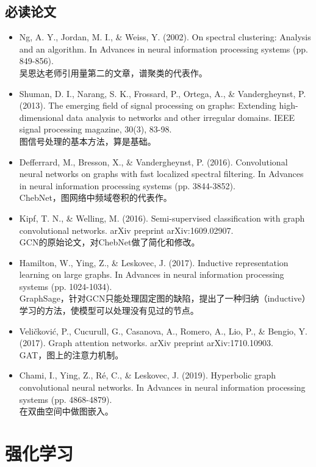 \documentclass[lang=cn,11pt,a4paper]{eleganttemplate}
\begin{document}
\subsection{必读论文}
\begin{itemize}
    \item Ng, A. Y., Jordan, M. I., \& Weiss, Y. (2002). On spectral clustering: Analysis and an algorithm. In Advances in neural information processing systems (pp. 849-856). \\
 	吴恩达老师引用量第二的文章，谱聚类的代表作。 
 	\item Shuman, D. I., Narang, S. K., Frossard, P., Ortega, A., \& Vandergheynst, P. (2013). The emerging field of signal processing on graphs: Extending high-dimensional data analysis to networks and other irregular domains. IEEE signal processing magazine, 30(3), 83-98. \\
 	图信号处理的基本方法，算是基础。
 	\item Defferrard, M., Bresson, X., \& Vandergheynst, P. (2016). Convolutional neural networks on graphs with fast localized spectral filtering. In Advances in neural information processing systems (pp. 3844-3852). \\
 	ChebNet，图网络中频域卷积的代表作。
 	\item Kipf, T. N., \& Welling, M. (2016). Semi-supervised classification with graph convolutional networks. arXiv preprint arXiv:1609.02907. \\
 	GCN的原始论文，对ChebNet做了简化和修改。
 	\item Hamilton, W., Ying, Z., \& Leskovec, J. (2017). Inductive representation learning on large graphs. In Advances in neural information processing systems (pp. 1024-1034). \\
 	GraphSage，针对GCN只能处理固定图的缺陷，提出了一种归纳（inductive）学习的方法，使模型可以处理没有见过的节点。
 	\item Veličković, P., Cucurull, G., Casanova, A., Romero, A., Lio, P., \& Bengio, Y. (2017). Graph attention networks. arXiv preprint arXiv:1710.10903. \\
 	GAT，图上的注意力机制。
 	\item Chami, I., Ying, Z., Ré, C., \& Leskovec, J. (2019). Hyperbolic graph convolutional neural networks. In Advances in neural information processing systems (pp. 4868-4879). \\
 	在双曲空间中做图嵌入。
\end{itemize}

\section{强化学习}
\end{document}
